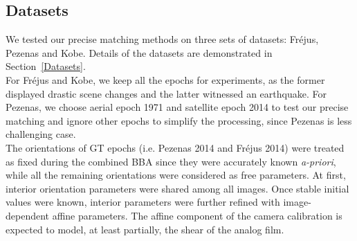 \subsection{Datasets}
We tested our precise matching methods on three sets of datasets: Fr{\'e}jus, Pezenas and Kobe. Details of the datasets are demonstrated in Section~\ref{Datasets}.\\
For Fr{\'e}jus and Kobe, we keep all the epochs for experiments, as the former displayed drastic scene changes and the latter witnessed an earthquake. For Pezenas, we choose aerial epoch 1971 and satellite epoch 2014 to test our precise matching and ignore other epochs to simplify the processing, since Pezenas is less challenging case.\\
The orientations of \ac{GT} epochs (i.e. Pezenas 2014 and Fr{\'e}jus 2014) were treated as fixed during the combined \ac{BBA} since they were accurately known \textit{a-priori}, while all the remaining orientations were considered as free parameters. At first, {interior orientation parameters} were shared among all images. Once stable initial values were known, interior parameters were further refined with image-dependent affine parameters. The affine component of the camera calibration is expected to model, at least partially, the shear of the analog film.\\
